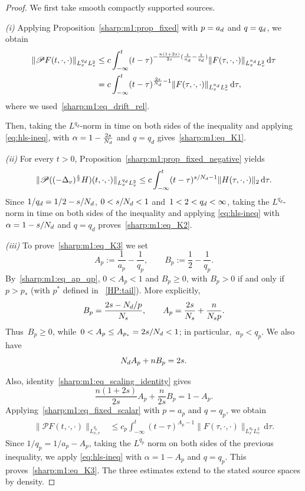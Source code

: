 \documentclass[10pt,a4paper]{amsart}
\theoremstyle{plain}
\theoremstyle{remark}
\begin{document}
\begin{proof}
We first take smooth compactly supported sources. 

\noindent
{\it (i)} Applying Proposition~\ref{sharp:m1:prop_fixed} with $p=a_{\rm d}$ and $q=q_{\rm d}$, we obtain
\begin{align*}
\|\mathscr PF(t,\cdot,\cdot)\|_{L^{q_{\rm d}}_xL^2_v}
&\leq
c\int_{-\infty}^t
(t-\tau)^{-\frac{n(1+2s)}{2s}(\frac1{a_{\rm d}}-\frac1{q_{\rm d}})}
\|F(\tau,\cdot,\cdot)\|_{L^{a_{\rm d}}_xL^2_v}
\,\mathrm d\tau
\\
&=
c\int_{-\infty}^t
(t-\tau)^{\frac{2s}{N_{\rm d}}-1}
\|F(\tau,\cdot,\cdot)\|_{L^{a_{\rm d}}_xL^2_v}
\,\mathrm d\tau,
\end{align*}
where we used~\eqref{sharp:m1:eq_drift_rel}.


Then, taking the $L^{q_d}$-norm in time on both sides of the inequality and applying \eqref{eq:hls-ineq}, with $\alpha=1 - \frac{2s}{N_{\rm d}}$ and $q=q_d$ gives~\eqref{sharp:m1:eq_K1}.

\noindent
{\it (ii)} For every $t>0$, Proposition~\ref{sharp:m1:prop_fixed_negative} yields
$$
\|\mathscr P((-\Delta_v)^\frac{s}{2}H)(t,\cdot,\cdot)\|_{L^{q_{\rm d}}_xL^2_v}
\leq
c\int_{-\infty}^t
(t-\tau)^{s/N_{\rm d}-1}
\|H(\tau,\cdot,\cdot)\|_2\,\mathrm d\tau.
$$
Since $1/q_{\rm d}=1/2-s/N_{\rm d}$, $0<s/N_{\rm d}<1$ and~$1<2<q_{\rm d}<\infty$, taking the $L^{q_d}$-norm in time on both sides of the inequality and applying \eqref{eq:hls-ineq} 
with $\alpha=1-s/N_{\rm d}$ and $q=q_d$ proves~\eqref{sharp:m1:eq_K2}.

\noindent
{\it (iii)} To prove~\eqref{sharp:m1:eq_K3} we set
\begin{equation}
\label{sharp:m1:eq_Ap_Bp}
A_p:=\frac1{a_p}-\frac1{q_p},
\qquad
B_p:=\frac12-\frac1{q_p}.
\end{equation}
By~\eqref{sharp:m1:eq_ap_qp}, $0<A_p<1$ and $B_p\geq0$, with $B_p>0$ if and only if $p>p_*$ (with $p^*$ defined in ~\eqref{HP:tail}). 
More explicitly,
\[
B_p=\frac{2s-N_{\rm d}/p}{N_s},
\qquad
A_p=\frac{2s}{N_s}+\frac{n}{N_sp}.
\]
Thus~$B_p\geq0$, while~$0<A_p\leq A_{p_*}=2s/N_{\rm d}<1$; in particular,~$a_p<q_p$. We also have
\begin{equation}
\label{sharp:m1:eq_scaling_identity}
N_{\rm d} A_p+nB_p=2s.
\end{equation}

Also, identity~\eqref{sharp:m1:eq_scaling_identity} gives
\begin{equation}
\label{sharp:m1:eq_beta_identity}
\frac{n(1+2s)}{2s}A_p+\frac n{2s}B_p
=1-A_p.
\end{equation}
Applying~\eqref{sharp:m1:eq_fixed_scalar} with $p=a_p$ and $q=q_p$, we obtain
\begin{align*}
\|\mathscr PF(t,\cdot,\cdot)\|_{L^{q_p}_{x,v}}
&\leq
c_p\int_{-\infty}^t
(t-\tau)^{A_p-1}
\|F(\tau,\cdot,\cdot)\|_{L^{a_p}_xL^2_v}
\,\mathrm d\tau.
\end{align*}
Since $1/q_p=1/a_p-A_p$, taking the $L^{q_p}$ norm on both sides of the previous inequality, we apply \eqref{eq:hls-ineq} with $\alpha = 1-A_p$
and $q=q_p$. This proves~\eqref{sharp:m1:eq_K3}.
The three estimates extend to the stated source spaces by density.
\end{proof}
\end{document}
